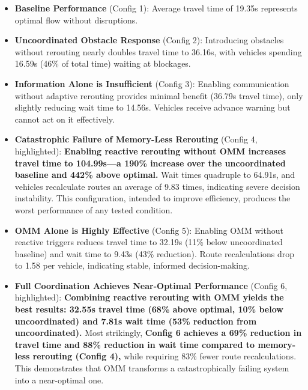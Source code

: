 \documentclass[conference]{IEEEtran}
\begin{document}
\begin{itemize}
    \item \textbf{Baseline Performance} (Config 1): Average travel time of 19.35s represents optimal flow without disruptions.
    
    \item \textbf{Uncoordinated Obstacle Response} (Config 2): Introducing obstacles without rerouting nearly doubles travel time to 36.16s, with vehicles spending 16.59s (46\% of total time) waiting at blockages.
    
    \item \textbf{Information Alone is Insufficient} (Config 3): Enabling communication without adaptive rerouting provides minimal benefit (36.79s travel time), only slightly reducing wait time to 14.56s. Vehicles receive advance warning but cannot act on it effectively.
    
    \item \textbf{Catastrophic Failure of Memory-Less Rerouting} (Config 4, highlighted): \textbf{Enabling reactive rerouting without OMM increases travel time to 104.99s—a 190\% increase over the uncoordinated baseline and 442\% above optimal.} Wait times quadruple to 64.91s, and vehicles recalculate routes an average of 9.83 times, indicating severe decision instability. This configuration, intended to improve efficiency, produces the worst performance of any tested condition.
    
    \item \textbf{OMM Alone is Highly Effective} (Config 5): Enabling OMM without reactive triggers reduces travel time to 32.19s (11\% below uncoordinated baseline) and wait time to 9.43s (43\% reduction). Route recalculations drop to 1.58 per vehicle, indicating stable, informed decision-making.
    
    \item \textbf{Full Coordination Achieves Near-Optimal Performance} (Config 6, highlighted): \textbf{Combining reactive rerouting with OMM yields the best results: 32.55s travel time (68\% above optimal, 10\% below uncoordinated) and 7.81s wait time (53\% reduction from uncoordinated).} Most strikingly, \textbf{Config 6 achieves a 69\% reduction in travel time and 88\% reduction in wait time compared to memory-less rerouting (Config 4),} while requiring 83\% fewer route recalculations. This demonstrates that OMM transforms a catastrophically failing system into a near-optimal one.
\end{itemize}
\end{document}
